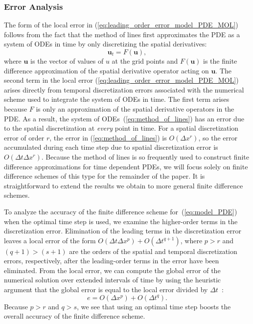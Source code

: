 \documentclass[fleqn,12pt,twoside]{article}
\newcommand{\beq}{\begin{equation}}
\newcommand{\eeq}{\end{equation}}
\def\dt{\Delta t}
\def\dx{\Delta x}
\begin{document}
\subsubsection*{\label{sec:error_analysis} 
            Error Analysis}
The form of the local error in 
(\ref{eq:leading_order_error_model_PDE_MOL}) follows from the fact 
that the method of lines first approximates the PDE as a system of ODEs in 
time by only discretizing the spatial derivatives: 
\beq
{\mathbf u}_t = F({\mathbf u}),
\label{eq:method_of_lines}
\eeq
where ${\mathbf u}$ is the vector of values of $u$ at the grid points and
$F({\mathbf u})$ is the finite difference approximation of the spatial 
derivative operator acting on ${\mathbf u}$.  The second term in the local 
error (\ref{eq:leading_order_error_model_PDE_MOL}) arises directly from 
temporal discretization errors associated with the numerical scheme used to 
integrate the system of ODEs in time.  The first term arises because $F$ is 
only an approximation of the spatial derivative operators in the PDE.  As a 
result, the system of ODEs~(\ref{eq:method_of_lines}) has an error due to 
the spatial discretization at \emph{every} point in time.  For a spatial 
discretization error of order $r$, the error in (\ref{eq:method_of_lines}) is 
$O(\dx^r)$, so the error accumulated during each time step due to 
spatial discretization error is $O(\dt \dx^r)$.  Because the method of 
lines is so frequently used to construct finite difference approximations for 
time dependent PDEs, we will focus solely on finite difference schemes of this 
type for the remainder of the paper.  It is straightforward to extend the 
results we obtain to more general finite difference schemes. 

To analyze the accuracy of the finite difference scheme 
for~(\ref{eq:model_PDE}) when the optimal time step is used, we examine the 
higher-order terms in the discretization error.  Elimination of the leading 
terms in the discretization error leaves a local error of the form 
$O(\dt \dx^p) + O(\dt^{q+1})$, where $p>r$ and $(q+1) > (s+1)$ are the orders 
of the spatial and temporal discretization errors, respectively, after the 
leading-order terms in the error have been eliminated.  
From the local error, we can compute the global error of the numerical 
solution over extended intervals of time by using the heuristic 
argument that the global error is equal to the local error divided by 
$\dt$~\cite{gko_book}:
\beq
e = O(\dx^p) + O(\dt^q).
\label{eq:global_error_ots}
\eeq
Because $p > r$ and $q > s$, we see that using an optimal time step 
boosts the overall accuracy of the finite difference scheme.
\end{document}
